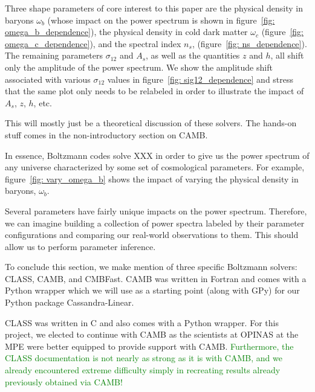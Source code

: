 
Three shape parameters of core interest to this paper are the physical density in baryons $\omega_b$ (whose impact on the power spectrum is shown in figure~\ref{fig: omega_b_dependence}), the physical density in cold dark matter $\omega_c$ (figure~\ref{fig: omega_c_dependence}), and the spectral index $n_s$, (figure~\ref{fig: ns_dependence}). The remaining parameters $\sigma_{12}$ and $A_s$, as well as the quantities $z$ and $h$, all shift only the amplitude of the power spectrum. We show the amplitude shift associated with various $\sigma_{12}$ values in figure~\ref{fig: sig12_dependence} and stress that the same plot only needs to be relabeled in order to illustrate the impact of $A_s$, $z$, $h$, etc. 


This will mostly just be a theoretical discussion of these solvers. The hands-on stuff comes in the non-introductory section on CAMB.


In essence, Boltzmann codes solve XXX in order to give us the power spectrum
of any universe characterized by some set of cosmological parameters. For
example, figure~\ref{fig: vary_omega_b} shows the impact of varying the
physical density in baryons, $\omega_b$. 

Several parameters have fairly unique impacts on the power spectrum.
Therefore, we can imagine building a collection of power spectra labeled by
their parameter configurations and comparing our real-world observations to
them. This should allow us to perform parameter inference.

To conclude this section, we make mention of three specific Boltzmann solvers: 
CLASS, CAMB, and CMBFast.
CAMB was written in Fortran and comes with a Python wrapper which we
will use as a starting point (along with GPy) for our Python package
Cassandra-Linear.

CLASS was written in C and also comes with a Python wrapper.
For this project, we elected to continue with CAMB as the scientists at
OPINAS at the MPE were better equipped to provide support with CAMB.
\textcolor{green}{Furthermore, the CLASS documentation
is not nearly as strong as it is with CAMB, and we already encountered
extreme difficulty simply in recreating results already previously obtained
via CAMB!}

